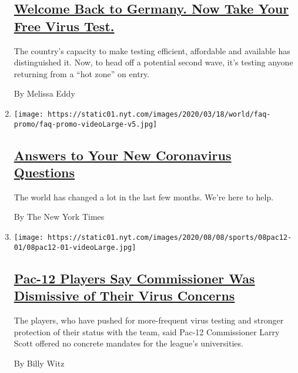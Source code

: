 \begin{enumerate}
  \hypertarget{welcome-back-to-germany-now-take-your-free-virus-test}{%
  \subsection{\texorpdfstring{\href{/2020/08/05/world/europe/germany-coronavirus-test-travelers.html}{Welcome
  Back to Germany. Now Take Your Free Virus
  Test.}}{Welcome Back to Germany. Now Take Your Free Virus Test.}}\label{welcome-back-to-germany-now-take-your-free-virus-test}}

  The country's capacity to make testing efficient, affordable and
  available has distinguished it. Now, to head off a potential second
  wave, it's testing anyone returning from a ``hot zone'' on entry.

  By Melissa Eddy
\item
  \texttt{[image: https://static01.nyt.com/images/2020/03/18/world/faq-promo/faq-promo-videoLarge-v5.jpg]}

  \hypertarget{answers-to-your-new-coronavirus-questions}{%
  \subsection{\texorpdfstring{\href{/interactive/2020/world/coronavirus-tips-advice.html}{Answers
  to Your New Coronavirus
  Questions}}{Answers to Your New Coronavirus Questions}}\label{answers-to-your-new-coronavirus-questions}}

  The world has changed a lot in the last few months. We're here to
  help.

  By The New York Times
\item
  \texttt{[image: https://static01.nyt.com/images/2020/08/08/sports/08pac12-01/08pac12-01-videoLarge.jpg]}

  \hypertarget{pac-12-players-say-commissioner-was-dismissive-of-their-virus-concerns}{%
  \subsection{\texorpdfstring{\href{/2020/08/08/sports/ncaafootball/coronavirus-pac-12-players-larry-scott.html}{Pac-12
  Players Say Commissioner Was Dismissive of Their Virus
  Concerns}}{Pac-12 Players Say Commissioner Was Dismissive of Their Virus Concerns}}\label{pac-12-players-say-commissioner-was-dismissive-of-their-virus-concerns}}

  The players, who have pushed for more-frequent virus testing and
  stronger protection of their status with the team, said Pac-12
  Commissioner Larry Scott offered no concrete mandates for the league's
  universities.

  By Billy Witz
\end{enumerate}

